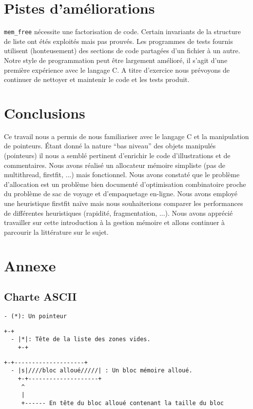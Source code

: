 \documentclass[11pt]{article}
\theoremstyle{definition}
\begin{document}
\section{Pistes d'améliorations}
\texttt{mem\_free} nécessite une factorisation de code.
Certain invariants de la structure de liste ont étés exploités mais pas prouvés.
Les programmes de tests fournis utilisent (honteusement) des sections de code partagées d'un fichier à un autre.
Notre style de programmation peut être largement amélioré, il s'agit d'une première expérience avec le langage C.
A titre d'exercice nous prévoyons de continuer de nettoyer et maintenir le code et les tests produit.

\section{Conclusions}
Ce travail nous a permis de nous familiariser avec le langage C et la manipulation de pointeurs.
Étant donné la nature ``bas niveau'' des objets manipulés (pointeurs) il nous a semblé pertinent d'enrichir le code
d'illustrations et de commentaires. 
Nous avons réalisé un allocateur mémoire simpliste (pas de multithread, firstfit, ...) mais fonctionnel.
Nous avons constaté que le problème d'allocation est un problème bien documenté d'optimisation combinatoire
proche du problème de sac de voyage et d'empaquetage en-ligne. Nous avons employé une heuristique firstfit naïve
mais nous souhaiterions comparer les performances de différentes heuristiques (rapidité, fragmentation, ...).
Nous avons apprécié travailler sur cette introduction à la gestion mémoire et allons continuer à parcourir la littérature
sur le sujet.
\section{Annexe}
\subsection{Charte ASCII}
\begin{lstlisting}[columns=fixed,basicstyle=\scriptsize\ttfamily]
  - (*): Un pointeur
\end{lstlisting}
\begin{lstlisting}[columns=fixed,basicstyle=\scriptsize\ttfamily]
    +-+
  - |*|: Tête de la liste des zones vides.
    +-+
\end{lstlisting}

\begin{lstlisting}[columns=fixed,basicstyle=\scriptsize\ttfamily]
    +-+--------------------+
  - |s|////bloc alloué/////| : Un bloc mémoire alloué.
    +-+--------------------+
     ^
     |
     +------ En tête du bloc alloué contenant la taille du bloc
\end{lstlisting}
\end{document}
